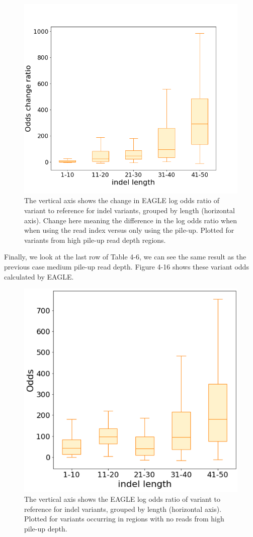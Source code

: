 \begin{figure}[H]
\centering
\includegraphics[width=0.6\columnwidth]{body/image/hi_odds_change.png}
\caption[high pile-up read depth odds change ratio]{The vertical axis shows the change in EAGLE log odds ratio of variant to reference for indel variants, grouped by length (horizontal axis).  Change here meaning the difference in the log odds ratio when when using the read index versus only using the pile-up.  Plotted for variants from high pile-up read depth regions.}
\label{hi_odds_change}
\end{figure}

Finally, we look at the last row of Table 4-6, we can see the same result as the previous case medium pile-up read depth. Figure 4-16 shows these variant odds calculated by EAGLE.

\begin{figure}[H]
\centering
\includegraphics[width=0.6\columnwidth]{body/image/hi_new_odds.png}
\caption[no reads with variants from high pile-up depth odds ratio]{The vertical axis shows the EAGLE log odds ratio of variant to reference for indel variants, grouped by length (horizontal axis).  Plotted for variants occurring in regions with no reads from high pile-up depth.}
\label{hi_new_odds}
\end{figure}


